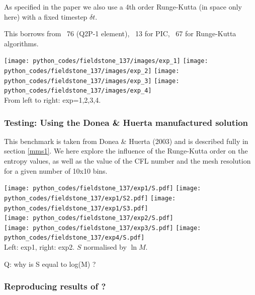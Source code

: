 As specified in the paper we also use a 4th order Runge-Kutta (in space only here)
with a fixed timestep $\delta t$.

This \stone borrows from \stone~76 (Q2P-1 element), \stone~13 for PIC, 
\stone~67 for Runge-Kutta algorithms.


\begin{center}
\texttt{[image: python\_codes/fieldstone\_137/images/exp\_1]}
\texttt{[image: python\_codes/fieldstone\_137/images/exp\_2]}
\texttt{[image: python\_codes/fieldstone\_137/images/exp\_3]}
\texttt{[image: python\_codes/fieldstone\_137/images/exp\_4]}\\
{\captionfont From left to right: exp=1,2,3,4.}
\end{center}

\subsubsection*{Testing: Using the Donea \& Huerta manufactured solution}

This benchmark is taken from Donea \& Huerta (2003) \cite{dohu03} and is described fully 
in section \ref{mms1}. 
We here explore the influence of the Runge-Kutta order on the entropy values, 
as well as the value of the CFL number and 
the mesh resolution for a given number of 10x10 bins. 

\begin{center}
\texttt{[image: python\_codes/fieldstone\_137/exp1/S.pdf]}
\texttt{[image: python\_codes/fieldstone\_137/exp1/S2.pdf]}
\texttt{[image: python\_codes/fieldstone\_137/exp1/S3.pdf]}\\
\texttt{[image: python\_codes/fieldstone\_137/exp2/S.pdf]}\\
\texttt{[image: python\_codes/fieldstone\_137/exp3/S.pdf]}
\texttt{[image: python\_codes/fieldstone\_137/exp4/S.pdf]}\\
{\captionfont Left: exp1, right: exp2. $S$ normalised by $\ln{M}$.}
\end{center}

Q: why is S equal to log(M) ?

\subsubsection*{Reproducing results of \textcite{cakm06}?}

